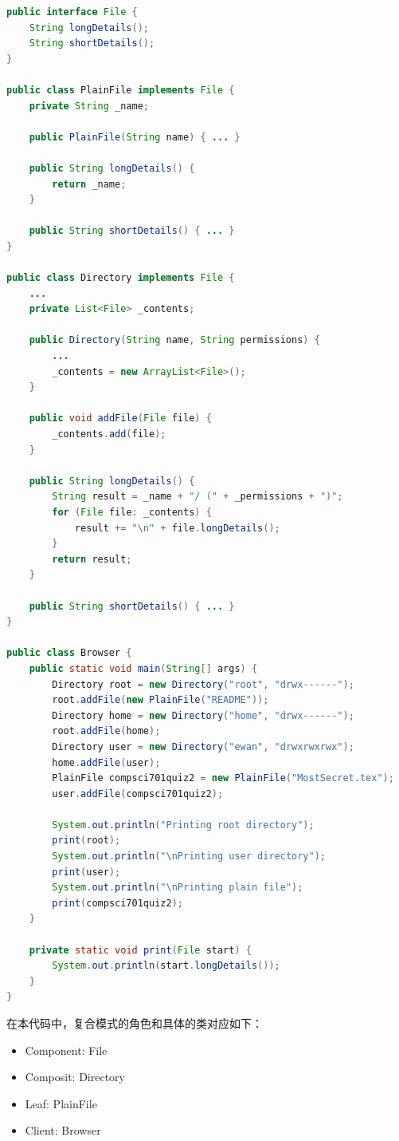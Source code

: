 \begin{lstlisting}[language=Java, caption=Composite Design Pattern Example, label=lst:composite_pattern]
public interface File {
    String longDetails();
    String shortDetails();
}

public class PlainFile implements File {
    private String _name;

    public PlainFile(String name) { ... }

    public String longDetails() {
        return _name;
    }

    public String shortDetails() { ... }
}

public class Directory implements File {
    ...
    private List<File> _contents;

    public Directory(String name, String permissions) {
        ...
        _contents = new ArrayList<File>();
    }

    public void addFile(File file) {
        _contents.add(file);
    }

    public String longDetails() {
        String result = _name + "/ (" + _permissions + ")";
        for (File file: _contents) {
            result += "\n" + file.longDetails();
        }
        return result;
    }

    public String shortDetails() { ... }
}

public class Browser {
    public static void main(String[] args) {
        Directory root = new Directory("root", "drwx------");
        root.addFile(new PlainFile("README"));
        Directory home = new Directory("home", "drwx------");
        root.addFile(home);
        Directory user = new Directory("ewan", "drwxrwxrwx");
        home.addFile(user);
        PlainFile compsci701quiz2 = new PlainFile("MostSecret.tex");
        user.addFile(compsci701quiz2);

        System.out.println("Printing root directory");
        print(root);
        System.out.println("\nPrinting user directory");
        print(user);
        System.out.println("\nPrinting plain file");
        print(compsci701quiz2);
    }

    private static void print(File start) {
        System.out.println(start.longDetails());
    }
}
\end{lstlisting}

在本代码中，复合模式的角色和具体的类对应如下：
\begin{itemize}
	\item Component: File
	\item Composit: Directory
	\item Leaf: PlainFile
	\item Client: Browser
\end{itemize}

